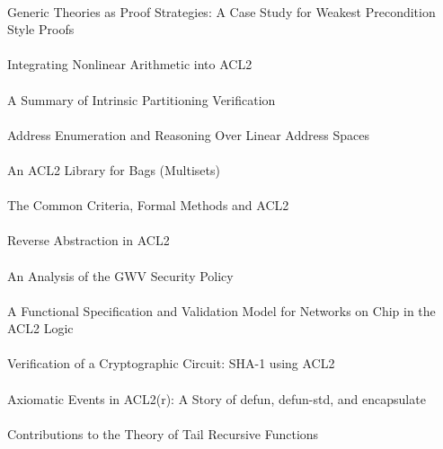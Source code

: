 \documentclass{article}
\begin{document}
\cite{04-legato-preconditions} \\
Generic Theories as Proof Strategies: A Case Study for Weakest Precondition Style Proofs \\

\cite{04-hunt-nonlinear} \\
Integrating Nonlinear Arithmetic into ACL2 \\

\cite{04-greve-partitioning} \\
A Summary of Intrinsic Partitioning Verification \\

\cite{04-greve-enumeration} \\
Address Enumeration and Reasoning Over Linear Address Spaces \\

\cite{04-smith-bags} \\
An ACL2 Library for Bags (Multisets) \\

\cite{04-richards-common} \\
The Common Criteria, Formal Methods and ACL2 \\

\cite{04-young-abstract} \\
Reverse Abstraction in ACL2 \\

\cite{04-foss-gwv} \\
An Analysis of the GWV Security Policy \\

\cite{04-schmaltz-network} \\
A Functional Specification and Validation Model for Networks on Chip in the ACL2 Logic \\

\cite{04-toma-sha} \\
Verification of a Cryptographic Circuit: SHA-1 using ACL2 \\

\cite{04-gamboa-axiomatic} \\
Axiomatic Events in ACL2(r): A Story of defun, defun-std, and encapsulate \\

\cite{04-cowles-tail} \\
Contributions to the Theory of Tail Recursive Functions \\




\end{document}
